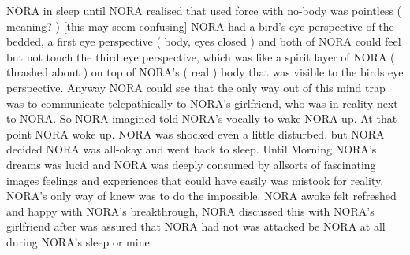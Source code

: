 \documentclass[12pt]{book}
\begin{document}
NORA in sleep until NORA realised that used force with no-body was pointless ( meaning? ) [this may seem confusing] NORA had a bird's eye perspective of the bedded, a first eye perspective ( body, eyes closed ) and both of NORA could feel but not touch the third eye perspective, which was like a spirit layer of NORA ( thrashed about ) on top of NORA's ( real ) body that was visible to the birds eye perspective. Anyway NORA could see that the only way out of this mind trap was to communicate telepathically to NORA's girlfriend, who was in reality next to NORA. So NORA imagined told NORA's vocally to wake NORA up. At that point NORA woke up. NORA was shocked even a little disturbed, but NORA decided NORA was all-okay and went back to sleep. Until Morning NORA's dreams was lucid and NORA was deeply consumed by allsorts of fascinating images feelings and experiences that could have easily was mistook for reality, NORA's only way of knew was to do the impossible. NORA awoke felt refreshed and happy with NORA's breakthrough, NORA discussed this with NORA's girlfriend after was assured that NORA had not was attacked be NORA at all during NORA's sleep or mine.
\end{document}
